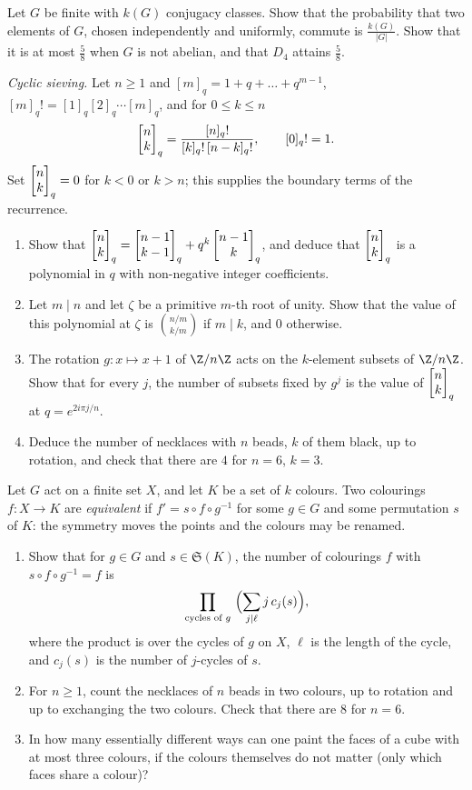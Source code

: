 \begin{exercise}[$\star\star\star$]\label{ex:commuting}
Let $G$ be finite with $k(G)$ conjugacy classes. Show that the probability that two elements of $G$, chosen independently and uniformly, commute is $\frac{k(G)}{|G|}$. Show that it is at most $\frac58$ when $G$ is not abelian, and that $D_4$ attains $\frac58$.
\end{exercise}

\begin{exercise}[$\star\star\star$]\label{pb:sieving}
\emph{Cyclic sieving.} Let $n\ge1$ and $[m]_q=1+q+\dots+q^{m-1}$, $[m]_q!=[1]_q[2]_q\cdots[m]_q$, and for $0\le k\le n$
\[
\begin{bmatrix}n\\k\end{bmatrix}_q=\frac{[n]_q!}{[k]_q!\,[n-k]_q!},\qquad [0]_q!=1.
\]
Set $\begin{bmatrix}n\\k\end{bmatrix}_q=0$ for $k<0$ or $k>n$; this supplies the boundary terms of the recurrence.
\begin{enumerate}[label=(\alph*)]
\item Show that $\begin{bmatrix}n\\k\end{bmatrix}_q=\begin{bmatrix}n-1\\k-1\end{bmatrix}_q+q^k\begin{bmatrix}n-1\\k\end{bmatrix}_q$, and deduce that $\begin{bmatrix}n\\k\end{bmatrix}_q$ is a polynomial in $q$ with
non-negative integer coefficients.
\item Let $m\mid n$ and let $\zeta$ be a primitive $m$-th root of unity. Show that the value of this polynomial at $\zeta$
is $\binom{n/m}{k/m}$ if $m\mid k$, and $0$ otherwise.
\item The rotation $g:x\mapsto x+1$ of $\Z/n\Z$ acts on the $k$-element subsets of $\Z/n\Z$. Show that for every $j$, the
number of subsets fixed by $g^j$ is the value of $\begin{bmatrix}n\\k\end{bmatrix}_q$ at $q=e^{2i\pi j/n}$.
\item Deduce the number of necklaces with $n$ beads, $k$ of them black, up to rotation, and check that there are $4$ for
$n=6$, $k=3$.
\end{enumerate}
\end{exercise}

\begin{exercise}[$\star\star$]\label{pb:patterns}
Let $G$ act on a finite set $X$, and let $K$ be a set of $k$ colours. Two colourings $f:X\to K$ are \emph{equivalent} if
$f'=s\circ f\circ g^{-1}$ for some $g\in G$ and some permutation $s$ of $K$: the symmetry moves the points and the colours may
be renamed.
\begin{enumerate}[label=(\alph*)]
\item Show that for $g\in G$ and $s\in\mathfrak S(K)$, the number of colourings $f$ with $s\circ f\circ g^{-1}=f$ is
\[
\prod_{\text{cycles of }g}\ \Bigl(\sum_{j\mid\ell}j\,c_j(s)\Bigr),
\]
where the product is over the cycles of $g$ on $X$, $\ell$ is the length of the cycle, and $c_j(s)$ is the number of $j$-cycles
of $s$.
\item For $n\ge1$, count the necklaces of $n$ beads in two colours, up to rotation and up to exchanging the two colours. Check that there
are $8$ for $n=6$.
\item In how many essentially different ways can one paint the faces of a cube with at most three colours, if the colours
themselves do not matter (only which faces share a colour)?
\end{enumerate}
\end{exercise}

